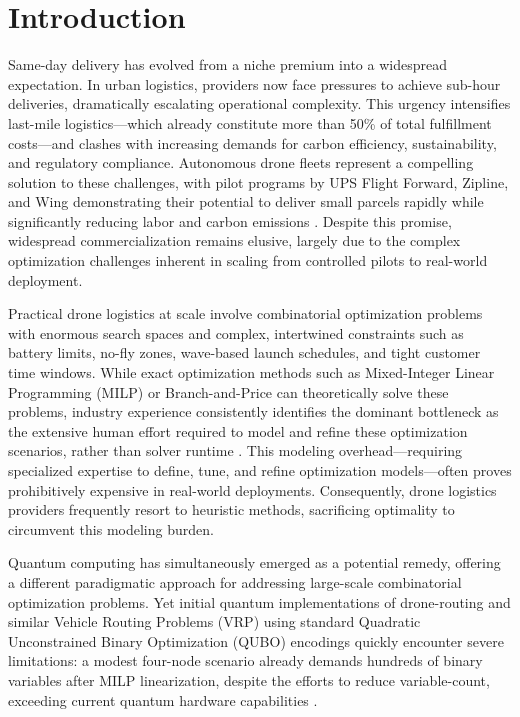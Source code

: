 \section{Introduction}

Same-day delivery has evolved from a niche premium into a widespread expectation.
In urban logistics, providers now face pressures to achieve sub-hour deliveries,
dramatically escalating operational complexity.
This urgency intensifies last-mile logistics—which already constitute more than 50\%
of total fulfillment costs—and clashes with increasing demands for carbon efficiency,
sustainability, and regulatory compliance.
Autonomous drone fleets represent a compelling solution to these challenges,
with pilot programs by UPS Flight Forward, Zipline, and Wing demonstrating their
potential to deliver small parcels rapidly while significantly reducing labor and
carbon emissions \cite{murray_multiple_2020}.
Despite this promise, widespread commercialization remains elusive, largely due to
the complex optimization challenges inherent in scaling from controlled pilots to
real-world deployment.

Practical drone logistics at scale involve combinatorial optimization problems with enormous
search spaces and complex, intertwined constraints such as battery limits, no-fly zones,
wave-based launch schedules, and tight customer time windows.
While exact optimization methods such as Mixed-Integer Linear Programming (MILP) or Branch-and-Price
can theoretically solve these problems, industry experience consistently identifies the dominant bottleneck
as the extensive human effort required to model and refine these optimization scenarios,
rather than solver runtime \cite{hildebrandt_implementation_1981,boschetti_contemporary_2024,kallrath_mixed_2000}.
This modeling overhead—requiring specialized expertise to define, tune, and refine optimization
models—often proves prohibitively expensive in real-world deployments.
Consequently, drone logistics providers frequently resort to heuristic methods,
sacrificing optimality to circumvent this modeling burden.

Quantum computing has simultaneously emerged as a potential remedy,
offering a different paradigmatic approach for addressing large-scale combinatorial optimization problems.
Yet initial quantum implementations of drone-routing and similar Vehicle Routing Problems (VRP)
using standard Quadratic Unconstrained Binary Optimization (QUBO) encodings quickly encounter severe limitations:
a modest four-node scenario already demands hundreds of binary variables after MILP linearization, despite the efforts to reduce variable-count,
exceeding current quantum hardware capabilities \cite{davies_quantum_2024}. 

